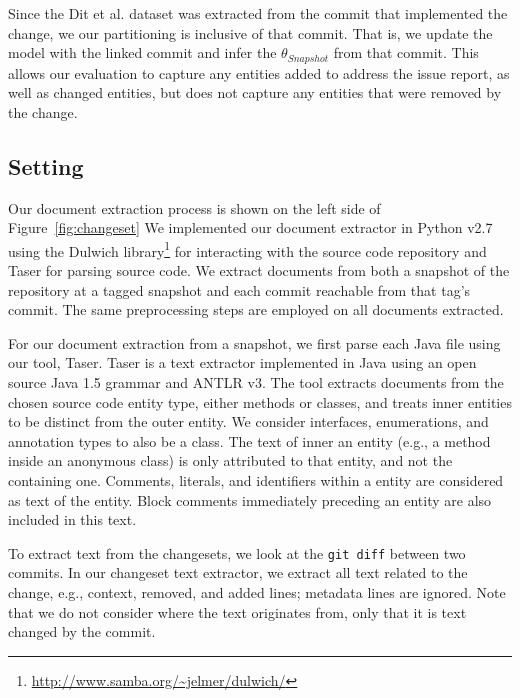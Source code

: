 Since the Dit et al. dataset was extracted from the commit that implemented the change,
we our partitioning is inclusive of that commit.
That is, we update the model with the linked commit and infer the
$\theta_{Snapshot}$ from that commit.
This allows our evaluation to capture any entities added to address the issue report,
as well as changed entities,
but does not capture any entities that were removed by the change.





\subsection{Setting}

Our document extraction process is shown on the left side of Figure~\ref{fig:changeset}
We implemented our document extractor in Python v2.7
using the Dulwich library\footnote{\url{http://www.samba.org/~jelmer/dulwich/}}
for interacting with the source code repository and
Taser for parsing source code.
We extract documents from both a snapshot of the repository at a tagged
snapshot and each commit reachable from that tag's commit.
The same preprocessing steps are employed on all documents extracted.

For our document extraction from a snapshot, we first parse each Java file using our tool, Taser.
Taser is a text extractor implemented in Java using an open source Java 1.5 grammar and ANTLR v3.
The tool extracts documents from the chosen source code entity type,
either methods or classes, and treats inner entities to be distinct from the outer entity.
We consider interfaces, enumerations, and annotation types to also be a class.
The text of inner an entity (e.g., a method inside an anonymous class)
is only attributed to that entity, and not the containing one.
Comments, literals, and identifiers within a entity are considered as text of the entity.
Block comments immediately preceding an entity are also included in this text.

To extract text from the changesets, we look at
the \texttt{git diff} between two commits.
In our changeset text extractor, we extract all text related to the
change, e.g., context, removed, and added lines; metadata lines are ignored.
Note that we do not consider where the text originates from,
only that it is text changed by the commit.%

